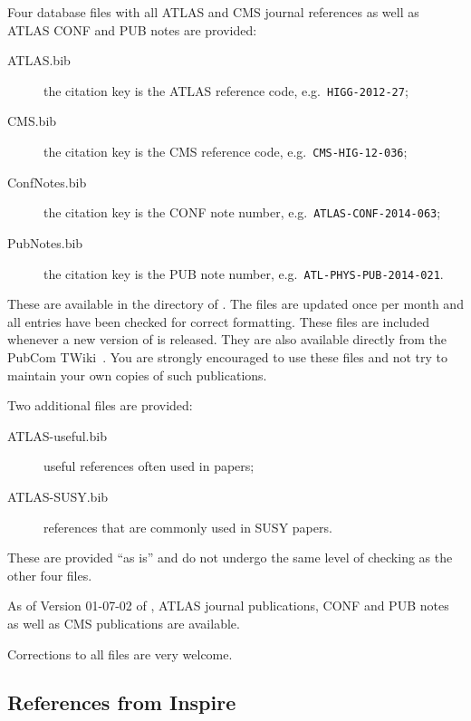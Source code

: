 \documentclass[UKenglish, texlive=2016]{\ATLASLATEXPATH atlasdoc}
\begin{document}
Four database files with all ATLAS and CMS journal references as well as
ATLAS CONF and PUB notes are provided:
\begin{description}
\item[ATLAS.bib] the citation key is the ATLAS reference code, e.g.\ \texttt{HIGG-2012-27};
\item[CMS.bib] the citation key is the CMS reference code, e.g.\ \texttt{CMS-HIG-12-036};
\item[ConfNotes.bib] the citation key is the CONF note number, e.g.\ \texttt{ATLAS-CONF-2014-063};
\item[PubNotes.bib] the citation key is the PUB note number, e.g.\ \texttt{ATL-PHYS-PUB-2014-021}.
\end{description}
These are available in the directory  of .
The files are updated once per month and all entries have been checked for correct formatting.
These files are included whenever a new version of  is released.
They are also available directly from the PubCom TWiki~\cite{pubcom-refs}.
You are strongly encouraged to use these files and not try to maintain your own copies of
such publications.

Two additional files are provided:
\begin{description}
  \item[ATLAS-useful.bib] useful references often used in papers;
  \item[ATLAS-SUSY.bib] references that are commonly used in SUSY papers.
\end{description}
These are provided \enquote{as is} and do not undergo the same level of checking as the other four files.

As of Version 01-07-02 of , ATLAS journal publications, CONF and PUB notes as well as
CMS publications are available.

Corrections to all files are very welcome.

\subsection{References from Inspire}
\label{sc:inquire}
\end{document}
